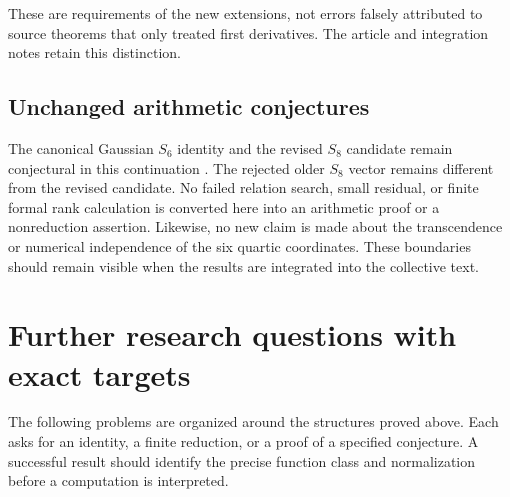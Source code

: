 \documentclass[11pt,a4paper]{article}
\numberwithin{equation}{section}
\theoremstyle{plain}
\theoremstyle{definition}
\theoremstyle{remark}
\begin{document}
These are requirements of the new extensions, not errors falsely
attributed to source theorems that only treated first derivatives.
The article and integration notes retain this distinction.

\subsection{Unchanged arithmetic conjectures}

The canonical Gaussian $S_6$ identity and the revised $S_8$ candidate
remain conjectural in this continuation \cite{Manuscript}.  The rejected
older $S_8$ vector remains different from the revised candidate.  No
failed relation search, small residual, or finite formal rank calculation
is converted here into an arithmetic proof or a nonreduction assertion.
Likewise, no new claim is made about the transcendence or numerical
independence of the six quartic coordinates.  These boundaries should
remain visible when the results are integrated into the collective text.



\section{Further research questions with exact targets}
\label{sec:research}

The following problems are organized around the structures proved above.
Each asks for an identity, a finite reduction, or a proof of a specified
conjecture.  A successful result should identify the precise function
class and normalization before a computation is interpreted.
\end{document}
